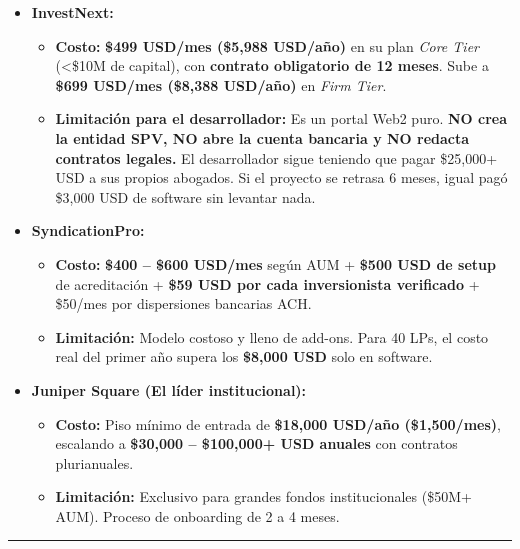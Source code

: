 \documentclass[
]{article}
\providecommand{\tightlist}{%
  \setlength{\itemsep}{0pt}\setlength{\parskip}{0pt}}
\begin{document}
\begin{itemize}
\tightlist
\item
  \textbf{InvestNext:}

  \begin{itemize}
  \tightlist
  \item
    \textbf{Costo:} \textbf{\$499 USD/mes (\$5,988 USD/año)} en su plan
    \emph{Core Tier} (\textless\$10M de capital), con \textbf{contrato
    obligatorio de 12 meses}. Sube a \textbf{\$699 USD/mes (\$8,388
    USD/año)} en \emph{Firm Tier}.
  \item
    \textbf{Limitación para el desarrollador:} Es un portal Web2 puro.
    \textbf{NO crea la entidad SPV, NO abre la cuenta bancaria y NO
    redacta contratos legales.} El desarrollador sigue teniendo que
    pagar \$25,000+ USD a sus propios abogados. Si el proyecto se
    retrasa 6 meses, igual pagó \$3,000 USD de software sin levantar
    nada.
  \end{itemize}
\item
  \textbf{SyndicationPro:}

  \begin{itemize}
  \tightlist
  \item
    \textbf{Costo:} \textbf{\$400 -- \$600 USD/mes} según AUM +
    \textbf{\$500 USD de setup} de acreditación + \textbf{\$59 USD por
    cada inversionista verificado} + \$50/mes por dispersiones bancarias
    ACH.
  \item
    \textbf{Limitación:} Modelo costoso y lleno de add-ons. Para 40 LPs,
    el costo real del primer año supera los \textbf{\$8,000 USD} solo en
    software.
  \end{itemize}
\item
  \textbf{Juniper Square (El líder institucional):}

  \begin{itemize}
  \tightlist
  \item
    \textbf{Costo:} Piso mínimo de entrada de \textbf{\$18,000 USD/año
    (\$1,500/mes)}, escalando a \textbf{\$30,000 -- \$100,000+ USD
    anuales} con contratos plurianuales.
  \item
    \textbf{Limitación:} Exclusivo para grandes fondos institucionales
    (\$50M+ AUM). Proceso de onboarding de 2 a 4 meses.
  \end{itemize}
\end{itemize}

\begin{center}\rule{0.5\linewidth}{0.5pt}\end{center}
\end{document}
